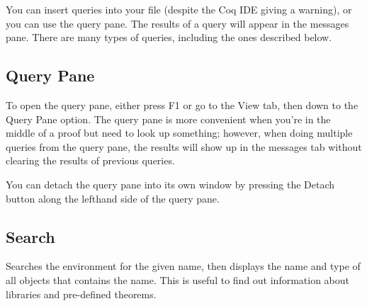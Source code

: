 
You can insert queries into your file (despite the Coq IDE giving a warning), or you can use the query pane. 
The results of a query will appear in the messages pane.
There are many types of queries, including the ones described below.

\subsection{Query Pane} \label{query_pane}
To open the query pane, either press F1 or go to the View tab, then down to the Query Pane option. 
The query pane is more convenient when you're in the middle of a proof but need to look up something; 
however, when doing multiple queries from the query pane, the results will show up in the messages tab without clearing the results of previous queries.

\begin{figure}[!h]
\end{figure}

\noindent
You can detach the query pane into its own window by pressing the Detach button along the lefthand side of the query pane.





\newpage
\subsection{Search} \label{search}
Searches the environment for the given name, then displays the name and type of all objects that contains the name. 
This is useful to find out information about libraries and pre-defined theorems. 

